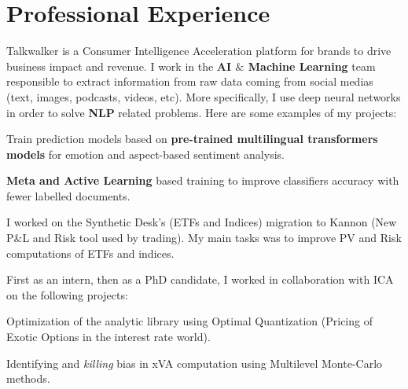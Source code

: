 \documentclass[]{deedy-resume-openfont}
\begin{document}
\lastupdated




\vspace{\topsep}

\section{Professional Experience}
\sectionsep

Talkwalker is a Consumer Intelligence Acceleration platform for brands to drive business impact and revenue. I work in the \textbf{AI $\&$ Machine Learning} team responsible to extract information from raw data coming from social medias (text, images, podcasts, videos, etc). More specifically, I use deep neural networks in order to solve \textbf{NLP} related problems. Here are some examples of my projects: $ $
\vspace{0.1cm}
\begin{tightemize}
	\item[\diamond] Train prediction models based on \textbf{pre-trained multilingual transformers models} for emotion and aspect-based sentiment analysis.
	\item[\diamond] \textbf{Meta and Active Learning} based training to improve classifiers accuracy with fewer labelled documents.
\end{tightemize}

\sectionsep

I worked on the Synthetic Desk's (ETFs and Indices) migration to Kannon (New P$\&$L and Risk tool used by trading). My main tasks was to improve PV and Risk computations of ETFs and indices.

\sectionsep

First as an intern, then as a PhD candidate, I worked in collaboration with ICA on the following projects:
\vspace{0.1cm}
\begin{tightemize}
	\item[\diamond] Optimization of the analytic library using Optimal Quantization (Pricing of Exotic Options in the interest rate world).
	\item[\diamond] Identifying and \textit{killing} bias in xVA computation using Multilevel Monte-Carlo methods.
\end{tightemize}
\end{document}
